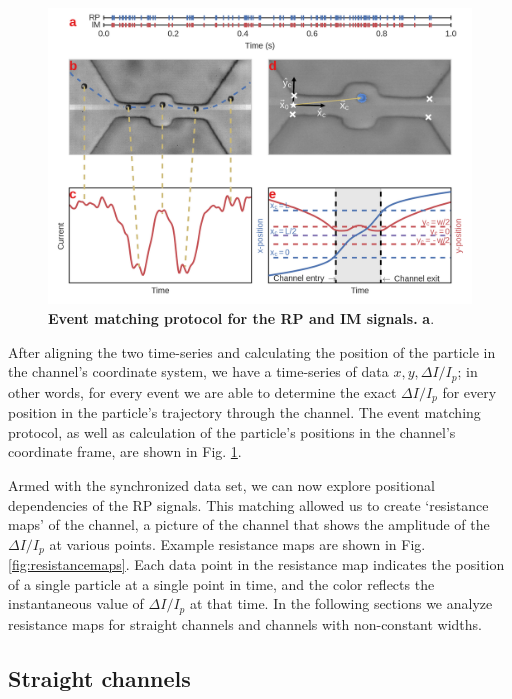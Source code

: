 		\begin{figure}
			\includegraphics[width=1\textwidth]{rpimsync}
			\caption{\textbf{Event matching protocol for the RP and IM signals.} \textbf{a}.}
			\label{fig:rpimsync}
		\end{figure}

		
		After aligning the two time-series and calculating the position of the particle in the channel's coordinate system, we have a time-series of data $x, y, \Delta I/I_{p}$; in other words, for every event we are able to determine the exact $\Delta I/I_{p}$ for every position in the particle's trajectory through the channel. The event matching protocol, as well as calculation of the particle's positions in the channel's coordinate frame, are shown in Fig. \ref{fig:rpimsync}. 
		

		
		
		
		Armed with the synchronized data set, we can now explore positional dependencies of the RP signals. This matching allowed us to create `resistance maps' of the channel, a picture of the channel that shows the amplitude of the $\Delta I/I_{p}$ at various points. Example resistance maps are shown in Fig. \ref{fig:resistancemaps}. Each data point in the resistance map indicates the position of a single particle at a single point in time, and the color reflects the instantaneous value of $\Delta I/I_{p}$ at that time. In the following sections we analyze resistance maps for straight channels and channels with non-constant widths.
		
		
		\subsection{Straight channels}
		

